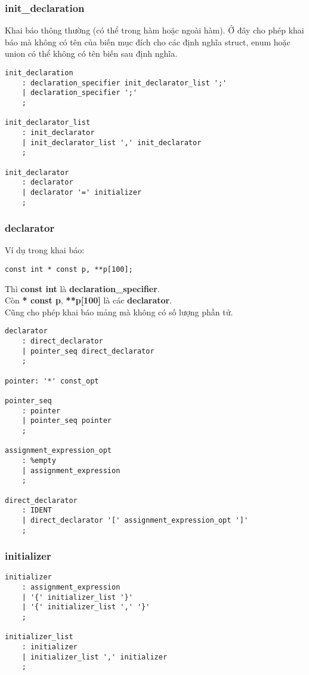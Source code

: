 \documentclass[../report.tex]{subfiles}
\begin{document}
\subsubsection{init\_declaration}
Khai báo thông thường (có thể trong hàm hoặc ngoài hàm). 
Ở đây cho phép khai báo mà không có tên của biến 
mục đích cho các định nghĩa struct, enum hoặc union có thể 
không có tên biến sau định nghĩa. 
\begin{lstlisting}
init_declaration
    : declaration_specifier init_declarator_list ';'
    | declaration_specifier ';'
    ;

init_declarator_list 
    : init_declarator
    | init_declarator_list ',' init_declarator 
    ;

init_declarator 
    : declarator 
    | declarator '=' initializer
    ;
\end{lstlisting}

\subsubsection{declarator}
Ví dụ trong khai báo: 
\begin{lstlisting}
const int * const p, **p[100];
\end{lstlisting}
Thì \textbf{const int} là \textbf{declaration\_specifier}. \\ 
Còn \textbf{* const p}, 
\textbf{**p[100]} là các \textbf{declarator}. \\
Cũng cho phép khai báo mảng mà không có số lượng phần tử. 

\begin{lstlisting}
declarator
    : direct_declarator 
    | pointer_seq direct_declarator
    ;

pointer: '*' const_opt

pointer_seq
    : pointer
    | pointer_seq pointer
    ;

assignment_expression_opt
    : %empty
    | assignment_expression
    ;

direct_declarator
    : IDENT
    | direct_declarator '[' assignment_expression_opt ']'
    ;
\end{lstlisting}


\subsubsection{initializer}
\begin{lstlisting}
initializer
    : assignment_expression
    | '{' initializer_list '}'
    | '{' initializer_list ',' '}'
    ;

initializer_list
    : initializer
    | initializer_list ',' initializer
    ;
\end{lstlisting}
\end{document}
